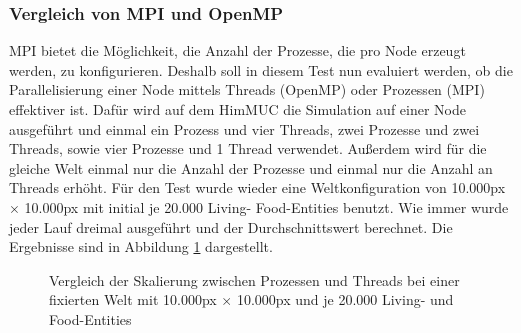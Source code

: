 \documentclass[course=erap]{aspdoc}
\begin{document}
\subsubsection{Vergleich von MPI und OpenMP}
MPI bietet die Möglichkeit, die Anzahl der Prozesse, die pro Node erzeugt werden, zu konfigurieren. Deshalb soll in diesem Test nun evaluiert werden, ob die Parallelisierung einer Node mittels Threads (OpenMP) oder Prozessen (MPI) effektiver ist. Dafür wird auf dem HimMUC die Simulation auf einer Node ausgeführt und einmal ein Prozess und vier Threads, zwei Prozesse und zwei Threads, sowie vier Prozesse und 1 Thread verwendet. Außerdem wird für die gleiche Welt einmal nur die Anzahl der Prozesse und einmal nur die Anzahl an Threads erhöht. Für den Test wurde wieder eine Weltkonfiguration von 10.000px $\times$ 10.000px mit initial je 20.000 Living- Food-Entities benutzt. Wie immer wurde jeder Lauf dreimal ausgeführt und der Durchschnittswert berechnet. Die Ergebnisse sind in Abbildung \ref{fig:threads-vs-processes} dargestellt.

\begin{figure}
\centering
\begin{minipage}{.5\textwidth}
\centering
{}
\end{minipage}%
\begin{minipage}{.5\textwidth}
\centering
{}
\end{minipage}
\caption{Vergleich der Skalierung zwischen Prozessen und Threads bei einer fixierten Welt mit 10.000px $\times$ 10.000px und je 20.000 Living- und Food-Entities}
\label{fig:threads-vs-processes}
\end{figure}
\end{document}
